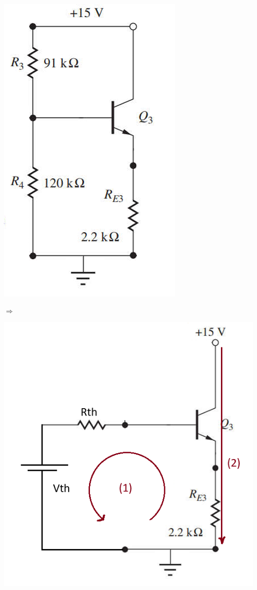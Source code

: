 \begin{itemize}[label=-]
		\begin{minipage}{0.4\linewidth}
			\includegraphics[width=.7\linewidth]{./my-chapters/my-images/Question6/DC_tang3.png}
		\end{minipage}
		\begin{minipage}{0.1\linewidth}
			$\Rightarrow$
		\end{minipage}
		\begin{minipage}{0.4\linewidth}
			\includegraphics[width=.8\linewidth]{./my-chapters/my-images/Question6/DC_tang3 - Copy.png}
		\end{minipage}
		

\end{itemize}
